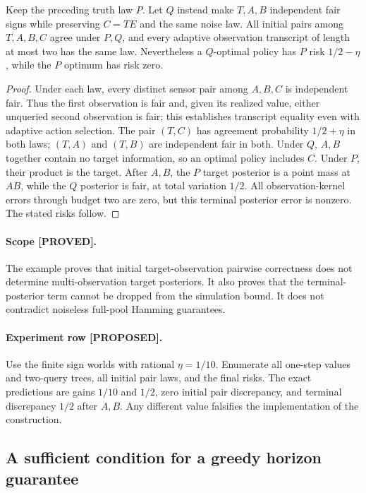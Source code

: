 \begin{counterexample}
Keep the preceding truth law $P$.  Let $Q$ instead make $T,A,B$ independent
fair signs while preserving $C=TE$ and the same noise law.  All initial
pairs among $T,A,B,C$ agree under $P,Q$, and every adaptive observation
transcript of length at most two has the same law.  Nevertheless a
$Q$-optimal policy has $P$ risk $1/2-\eta$, while the $P$ optimum has
risk zero.
\end{counterexample}
\begin{proof}
Under each law, every distinct sensor pair among $A,B,C$ is independent
fair.  Thus the first observation is fair and, given its realized value,
either unqueried second observation is fair; this establishes transcript
equality even with adaptive action selection.  The pair $(T,C)$ has
agreement probability $1/2+\eta$ in both laws; $(T,A)$ and $(T,B)$ are
independent fair in both.  Under $Q$, $A,B$ together contain no target
information, so an optimal policy includes $C$.  Under $P$, their product
is the target.  After $A,B$, the $P$ target posterior is a point mass at
$AB$, while the $Q$ posterior is fair, at total variation $1/2$.  All
observation-kernel errors through budget two are zero, but this terminal
posterior error is nonzero.  The stated risks follow.
\end{proof}

\paragraph{Scope [PROVED].}
The example proves that initial target-observation pairwise correctness
does not determine multi-observation target posteriors.  It also proves
that the terminal-posterior term cannot be dropped from the simulation
bound.  It does not contradict noiseless full-pool Hamming guarantees.

\paragraph{Experiment row [PROPOSED].}
Use the finite sign worlds with rational $\eta=1/10$.  Enumerate all
one-step values and two-query trees, all initial pair laws, and the final
risks.  The exact predictions are gains $1/10$ and $1/2$, zero initial
pair discrepancy, and terminal discrepancy $1/2$ after $A,B$.  Any
different value falsifies the implementation of the construction.

\subsection{A sufficient condition for a greedy horizon guarantee}

